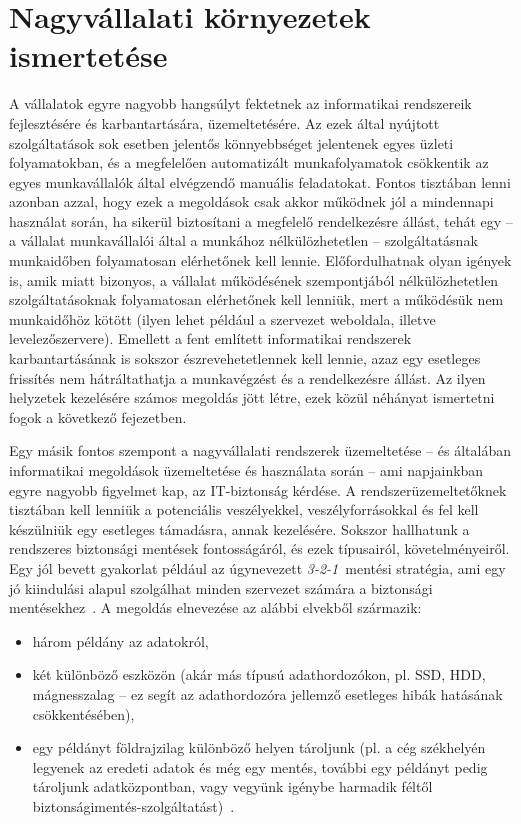 

\chapter{Nagyvállalati környezetek ismertetése}

A vállalatok egyre nagyobb hangsúlyt fektetnek az informatikai rendszereik fejlesztésére és karbantartására, üzemeltetésére. Az ezek által nyújtott szolgáltatások sok esetben jelentős könnyebbséget jelentenek egyes üzleti folyamatokban, és a megfelelően automatizált munkafolyamatok csökkentik az egyes munkavállalók által elvégzendő manuális feladatokat. Fontos tisztában lenni azonban azzal, hogy ezek a megoldások csak akkor működnek jól a mindennapi használat során, ha sikerül biztosítani a megfelelő rendelkezésre állást, tehát egy -- a vállalat munkavállalói által a munkához nélkülözhetetlen -- szolgáltatásnak munkaidőben folyamatosan elérhetőnek kell lennie. Előfordulhatnak olyan igények is, amik miatt bizonyos, a vállalat működésének szempontjából nélkülözhetetlen szolgáltatásoknak folyamatosan elérhetőnek kell lenniük, mert a működésük nem munkaidőhöz kötött (ilyen lehet például a szervezet weboldala, illetve levelezőszervere).  Emellett a fent említett informatikai rendszerek karbantartásának is sokszor észrevehetetlennek kell lennie, azaz egy esetleges frissítés nem hátráltathatja a munkavégzést és a rendelkezésre állást. Az ilyen helyzetek kezelésére számos megoldás jött létre, ezek közül néhányat ismertetni fogok a következő fejezetben.

Egy másik fontos szempont a nagyvállalati rendszerek üzemeltetése -- és általában informatikai megoldások üzemeltetése és használata során -- ami napjainkban egyre nagyobb figyelmet kap, az IT-biztonság kérdése. A rendszerüzemeltetőknek tisztában kell lenniük a potenciális veszélyekkel, veszélyforrásokkal és fel kell készülniük egy esetleges támadásra, annak kezelésére. Sokszor hallhatunk a rendszeres biztonsági mentések fontosságáról, és ezek típusairól, követelményeiről. Egy jól bevett gyakorlat például az úgynevezett \textit{\mbox{3-2-1}}~mentési stratégia, ami egy jó kiindulási alapul szolgálhat minden szervezet számára a biztonsági mentésekhez~\cite{Backblaze321}.
A megoldás elnevezése az alábbi elvekből származik:
\begin{itemize}
	\item három példány az adatokról,
	\item két különböző eszközön (akár más típusú adathordozókon, pl. SSD, HDD, mágnesszalag -- ez segít az adathordozóra jellemző esetleges hibák hatásának csökkentésében),
	\item egy példányt földrajzilag különböző helyen tároljunk (pl. a cég székhelyén legyenek az eredeti adatok és még egy mentés, további egy példányt pedig tároljunk adatközpontban, vagy vegyünk igénybe harmadik féltől biztonságimentés-szolgáltatást)~\cite{Seagate321}.
\end{itemize}

